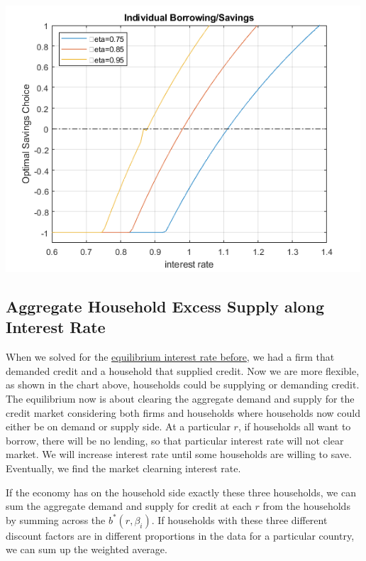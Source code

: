 \documentclass[
]{book}
\begin{document}
\includegraphics[width=5.20833in,height=\textheight]{img/equilibrium_constrainedborrow_images/figure_0.png}

\hypertarget{aggregate-household-excess-supply-along-interest-rate}{%
\subsection{Aggregate Household Excess Supply along Interest Rate}\label{aggregate-household-excess-supply-along-interest-rate}}

When we solved for the \href{https://math4econ.github.io/matrix_application/demand_supply_taylor_approximate_capital.html}{equilibrium interest rate
before},
we had a firm that demanded credit and a household that supplied credit.
Now we are more flexible, as shown in the chart above, households could
be supplying or demanding credit. The equilibrium now is about clearing
the aggregate demand and supply for the credit market considering both
firms and households where households now could either be on demand or
supply side. At a particular \(r\), if households all want to borrow,
there will be no lending, so that particular interest rate will not
clear market. We will increase interest rate until some households are
willing to save. Eventually, we find the market clearning interest rate.

If the economy has on the household side exactly these three households,
we can sum the aggregate demand and supply for credit at each \(r\) from
the households by summing across the \(b^* (r,\beta_i )\). If households
with these three different discount factors are in different proportions
in the data for a particular country, we can sum up the weighted
average.
\end{document}
